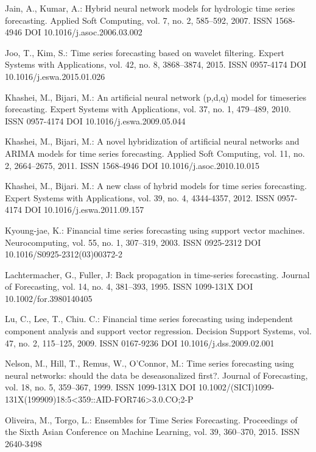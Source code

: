 \begin{thebibliography}{99.}
 Jain, A., Kumar, A.: Hybrid neural network models for hydrologic time series forecasting. Applied Soft Computing, vol. 7, no. 2, 585--592, 2007. ISSN 1568-4946 DOI 10.1016/j.asoc.2006.03.002

 Joo, T., Kim, S.: Time series forecasting based on wavelet filtering. Expert Systems with Applications, vol. 42, no. 8, 3868--3874, 2015. ISSN 0957-4174 DOI 10.1016/j.eswa.2015.01.026

 Khashei, M., Bijari, M.: An artificial neural network (p,d,q) model for timeseries forecasting. Expert Systems with Applications, vol. 37, no. 1, 479--489, 2010. ISSN 0957-4174 DOI 10.1016/j.eswa.2009.05.044

 Khashei, M., Bijari, M.: A novel hybridization of artificial neural networks and ARIMA models for time series forecasting. Applied Soft Computing, vol. 11, no. 2, 2664--2675, 2011. ISSN 1568-4946 DOI 10.1016/j.asoc.2010.10.015

 Khashei, M., Bijari. M.: A new class of hybrid models for time series forecasting. Expert Systems with Applications, vol. 39, no. 4, 4344-4357, 2012. ISSN 0957-4174 DOI 10.1016/j.eswa.2011.09.157

 Kyoung-jae, K.: Financial time series forecasting using support vector machines. Neurocomputing, vol. 55, no. 1, 307--319, 2003. ISSN 0925-2312 DOI 10.1016/S0925-2312(03)00372-2

 Lachtermacher, G., Fuller, J: Back propagation in time-series forecasting. Journal of Forecasting, vol. 14, no. 4, 381--393, 1995. ISSN 1099-131X DOI 10.1002/for.3980140405

 Lu, C., Lee, T., Chiu. C.: Financial time series forecasting using independent component analysis and support vector regression. Decision Support Systems, vol. 47, no. 2, 115--125, 2009. ISSN 0167-9236 DOI 10.1016/j.dss.2009.02.001

 Nelson, M., Hill, T., Remus, W., O'Connor, M.: Time series forecasting using neural networks: should the data be deseasonalized first?. Journal of Forecasting, vol. 18, no. 5, 359--367, 1999. ISSN 1099-131X DOI 10.1002/(SICI)1099-131X(199909)18:5<359::AID-FOR746>3.0.CO;2-P

 Oliveira, M., Torgo, L.: Ensembles for Time Series Forecasting. Proceedings of the Sixth Asian Conference on Machine Learning, vol. 39, 360--370, 2015. ISSN 2640-3498


\end{thebibliography}
